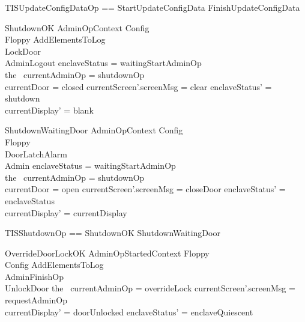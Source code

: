 \begin{zed}
        TISUpdateConfigDataOp == StartUpdateConfigData \lor FinishUpdateConfigData
\end{zed}

\begin{schema}{ShutdownOK}
        AdminOpContext
\also   
        \Xi Config
\\      \Xi Floppy
\also
        AddElementsToLog
\\      LockDoor
\\      AdminLogout
\where
        enclaveStatus = waitingStartAdminOp
\\      the~ currentAdminOp = shutdownOp
\\      currentDoor = closed
\also
        currentScreen'.screenMsg = clear
\also
        enclaveStatus' = shutdown
\\      currentDisplay' = blank
\end{schema}

\begin{schema}{ShutdownWaitingDoor}
        AdminOpContext
\also   
        \Xi Config
\\      \Xi Floppy
\\      \Xi DoorLatchAlarm
\\      \Xi Admin
\where
        enclaveStatus = waitingStartAdminOp
\\      the~ currentAdminOp = shutdownOp
\\      currentDoor = open
\also
        currentScreen'.screenMsg = closeDoor
\also
        enclaveStatus' = enclaveStatus
\\      currentDisplay' = currentDisplay
\end{schema}

\begin{zed}
        TISShutdownOp == ShutdownOK \lor ShutdownWaitingDoor
\end{zed}

\begin{schema}{OverrideDoorLockOK}
        AdminOpStartedContext
\also   
        \Xi Floppy
\\      \Xi Config
\also
        AddElementsToLog
\\      AdminFinishOp
\\      UnlockDoor
\where
        the~ currentAdminOp = overrideLock
\also
        currentScreen'.screenMsg = requestAdminOp
\\      currentDisplay' = doorUnlocked
\also
        enclaveStatus' = enclaveQuiescent
\end{schema}

